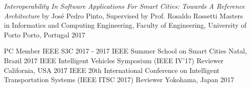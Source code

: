 


\begin{cvhonors}
  \cvhonor
    {\emph{Interoperability In Software Applications For Smart Cities: Towards A Reference Architecture} by José Pedro Pinto, Supervised by Prof. Rosaldo Rossetti}
    {Masters in Informatics and Computing Engineering, Faculty of Engineering, University of Porto}
    {Porto, Portugal}
    {2017}
\end{cvhonors}


\begin{cvhonors}
  \cvhonor
    {PC Member}
    {IEEE S3C 2017 - 2017 IEEE Summer School on Smart Cities}
    {Natal, Brazil}
    {2017}
  \cvhonor
    {IEEE Intelligent Vehicles Symposium (IEEE IV'17)}
    {Reviewer}
    {California, USA}
    {2017}
   \cvhonor
    {IEEE 20th International Conference on Intelligent Transportation Systems (IEEE ITSC 2017)}
    {Reviewer}
    {Yokohama, Japan}
    {2017}
\end{cvhonors}
